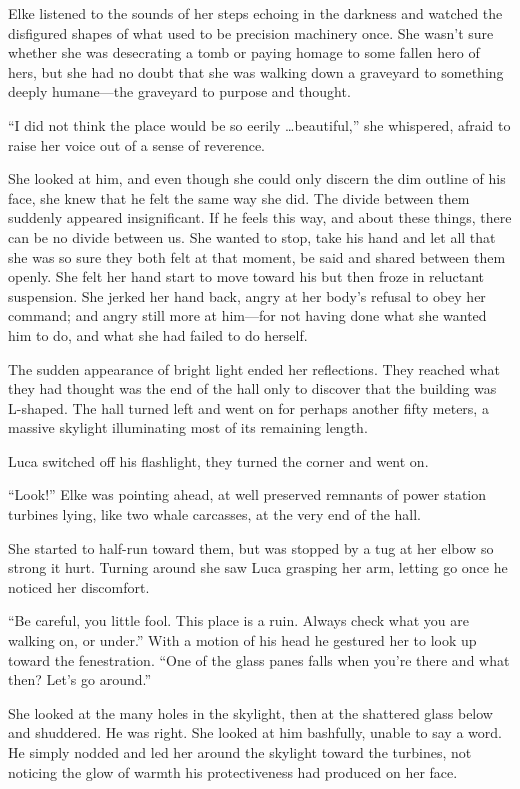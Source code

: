 Elke listened to the sounds of her steps echoing in the darkness and watched the disfigured shapes of what used to be precision machinery once. She wasn't sure whether she was desecrating a tomb or paying homage to some fallen hero of hers, but she had no doubt that she was walking down a graveyard to something deeply humane---the graveyard to purpose and thought.

``I did not think the place would be so eerily \ldots beautiful,'' she whispered, afraid to raise her voice out of a sense of reverence.

She looked at him, and even though she could only discern the dim outline of his face, she knew that he felt the same way she did. The divide between them suddenly appeared insignificant. If he feels this way, and about these things, there can be no divide between us. She wanted to stop, take his hand and let all that she was so sure they both felt at that moment, be said and shared between them openly. She felt her hand start to move toward his but then froze in reluctant suspension. She jerked her hand back, angry at her body's refusal to obey her command; and angry still more at him---for not having done what she wanted him to do, and what she had failed to do herself.

The sudden appearance of bright light ended her reflections. They reached what they had thought was the end of the hall only to discover that the building was L-shaped. The hall turned left and went on for perhaps another fifty meters, a massive skylight illuminating most of its remaining length.

Luca switched off his flashlight, they turned the corner and went on.

``Look!'' Elke was pointing ahead, at well preserved remnants of power station turbines lying, like two whale carcasses, at the very end of the hall.

She started to half-run toward them, but was stopped by a tug at her elbow so strong it hurt. Turning around she saw Luca grasping her arm, letting go once he noticed her discomfort.

``Be careful, you little fool. This place is a ruin. Always check what you are walking on, or under.'' With a motion of his head he gestured her to look up toward the fenestration. ``One of the glass panes falls when you're there and what then? Let's go around.''

She looked at the many holes in the skylight, then at the shattered glass below and shuddered. He was right. She looked at him bashfully, unable to say a word. He simply nodded and led her around the skylight toward the turbines, not noticing the glow of warmth his protectiveness had produced on her face.

